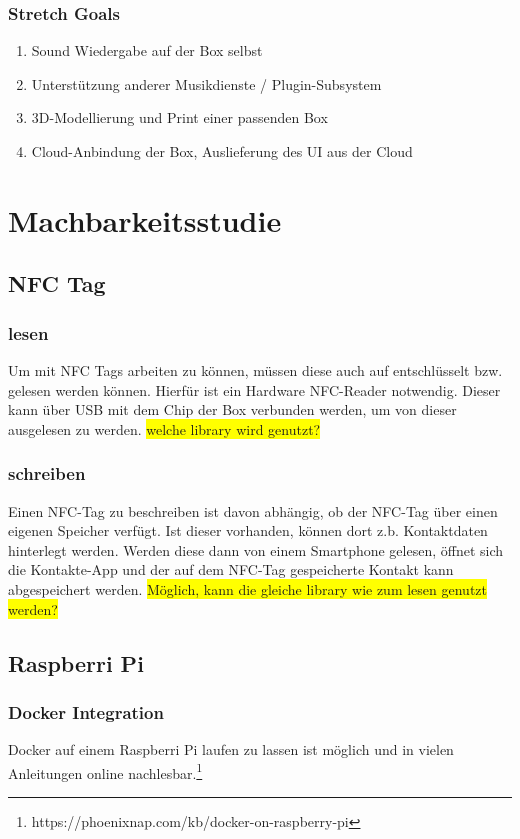 \documentclass[10pt, a4paper, draft]{article}
\begin{document}
\subsubsection{Stretch Goals}
\begin{enumerate}
  \item Sound Wiedergabe auf der Box selbst
  \item Unterstützung anderer Musikdienste / Plugin-Subsystem
  \item 3D-Modellierung und Print einer passenden Box
  \item Cloud-Anbindung der Box, Auslieferung des UI aus der Cloud
\end{enumerate}

\section{Machbarkeitsstudie}

\subsection{NFC Tag}
\subsubsection{lesen}
Um mit NFC Tags arbeiten zu können, müssen diese auch auf entschlüsselt bzw. gelesen werden können.
Hierfür ist ein Hardware NFC-Reader notwendig. Dieser kann über USB mit dem Chip der Box verbunden werden, um von dieser ausgelesen zu werden.
\colorbox{yellow}{welche library wird genutzt?}

\subsubsection{schreiben}
Einen NFC-Tag zu beschreiben ist davon abhängig, ob der NFC-Tag über einen eigenen Speicher verfügt.
Ist dieser vorhanden, können dort z.b. Kontaktdaten hinterlegt werden. Werden diese dann von einem Smartphone gelesen, öffnet sich die Kontakte-App und der auf dem NFC-Tag gespeicherte Kontakt kann abgespeichert werden.
\colorbox{yellow}{Möglich, kann die gleiche library wie zum lesen genutzt werden?}

\subsection{Raspberri Pi}
\subsubsection{Docker Integration}
Docker auf einem Raspberri Pi laufen zu lassen ist möglich und in vielen Anleitungen online nachlesbar.\footnote{https://phoenixnap.com/kb/docker-on-raspberry-pi}
\end{document}
